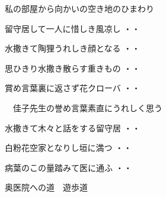 \qquad \qquad \qquad 私の部屋から向かいの空き地のひまわり
\begin{shiika}留守居して一人に惜しき風凉し
\hfill{・・}\end{shiika}
\begin{shiika}水撒きて陶狸うれしき顔となる
\hfill{・・}\end{shiika}
\begin{shiika}思ひきり水撒き散らす重きもの
\hfill{・・}\end{shiika}
\begin{shiika}賞め言葉裏に返さず花クローバ
\hfill{・・}\end{shiika}
\qquad\qquad\qquad　佳子先生の誉め言葉素直にうれしく思う
\begin{shiika}水撒きて木々と話をする留守居
\hfill{・・}\end{shiika}
\begin{shiika}白粉花空家となりし垣に満つ
\hfill{・・}\end{shiika}
\begin{shiika}病葉のこの量踏みて医に通ふ
\hfill{・・}\end{shiika}
\qquad\qquad\qquad 奥医院への道　遊歩道\\

